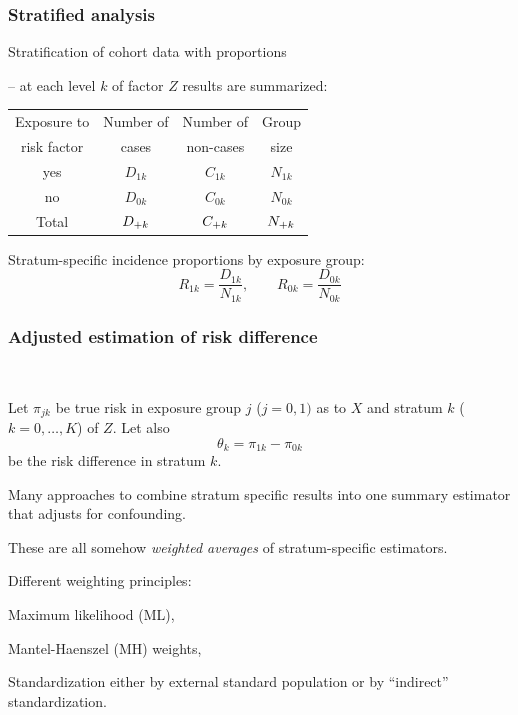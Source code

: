 \documentclass[handout,12pt]{beamer}
\begin{document}

\begin{frame}[fragile] \frametitle{Stratified analysis}
Stratification of cohort data with proportions 
\bi
\item[--] at each level $k$ of factor $Z$ results are summarized:
\ei
\begin{center}
\begin{tabular}{cccc}
\toprule
Exposure to &  Number of &  Number of &  Group\\
risk factor &  cases &  non-cases  &  size\\
\midrule
yes        &                $D_{1k}$ &    $C_{1k}$  &    $N_{1k}$ \\
no         &                $D_{0k}$ &    $C_{0k}$  &    $N_{0k}$ \\
\midrule    
     Total        &                $D_{\tiny + k}$  &  $C_{\tiny + k}$  &   $N_{\tiny + k}$ \\
\bottomrule
\end{tabular}
\end{center}

Stratum-specific incidence proportions by exposure group: 
$$ R_{1k}  = \frac{ D_{1k} }{ N_{1k} } , \qquad
   R_{0k}  = \frac{ D_{0k} }{ N_{0k} } $$
\end{frame} 


\begin{frame}[fragile] \frametitle{Adjusted estimation of risk difference}
\ \\
\bi
\item Let $\pi_{jk}$ be true risk in exposure group $j$ ($j=0,1)$ as to $X$
and stratum $k$ ($k=0, \dots, K$) of $Z$. Let also
$$ \theta_k = { \pi_{1k} } - { \pi_{0k} } $$
be the risk difference in stratum $k$.
\medskip
\item Many approaches to combine stratum specific results 
into one summary estimator that adjusts for confounding.

\medskip
These are all somehow {\em weighted averages} of stratum-specific
estimators.
\medskip
\item Different weighting principles:
  \bi
  \item Maximum likelihood (ML), 
  \item Mantel-Haenszel (MH) weights,
  \item Standardization either by external standard population 
  or by ``indirect'' standardization.
  \ei
\ei
\end{frame} 
\end{document}
